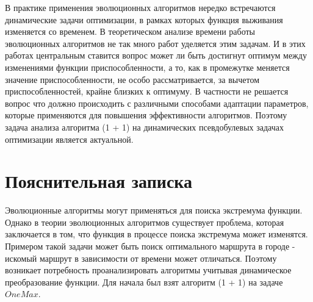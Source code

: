 \documentclass[times,specification,annotation]{itmo-student-thesis}
\begin{document}



    \tableofcontents


    \startprefacepage

    В практике применения эволюционных алгоритмов нередко встречаются динамические задачи оптимизации, в рамках которых функция выживания изменяется со временем.
    В теоретическом анализе времени работы эволюционных алгоритмов не так много работ уделяется этим задачам.
    И в этих работах центральным ставится вопрос может ли быть достигнут оптимум между изменениями функции приспособленности, а то, как в промежутке меняется значение приспособленности, не особо рассматривается, за вычетом приспособленностей, крайне близких к оптимуму.
    В частности не решается вопрос что должно происходить с различными способами адаптации параметров, которые применяются для повышения эффективности алгоритмов. Поэтому задача анализа алгоритма (1 + 1) на динамических псевдобулевых задачах оптимизации является актуальной.


    \chapter{Пояснительная записка}

    Эволюционные алгоритмы могут применяться для поиска экстремума функции.
    Однако в теории эволюционных алгоритмов существует проблема, которая заключается в том, что функция в процессе поиска экстремума может изменятся.
    Примером такой задачи может быть поиск оптимального маршрута в городе - искомый маршрут в зависимости от времени может отличаться.
    Поэтому возникает потребность проанализировать алгоритмы учитывая динамическое преобразование функции.
    Для начала был взят алгоритм (1 + 1) на задаче $OneMax$.
\end{document}
